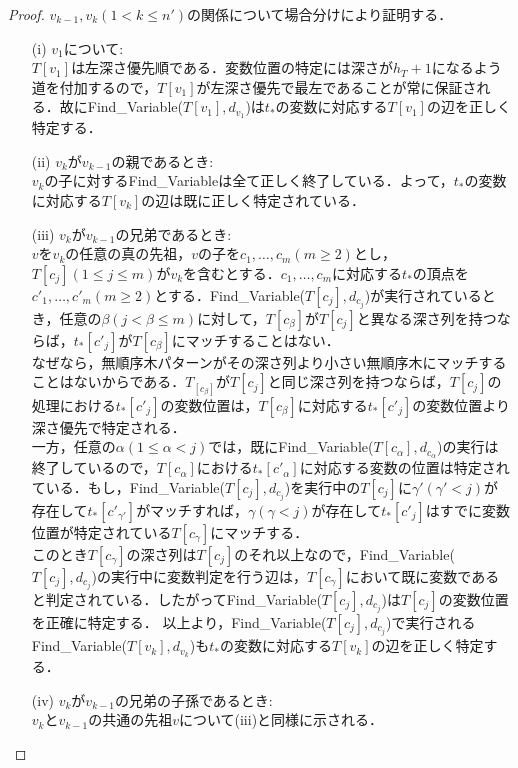 \begin{proof}
  $v_{k-1},v_k(1<k\leq n')$の関係について場合分けにより証明する．
  \begin{enumerate}
    \item[(i)] $v_1$について:\\
                $T[v_1]$は左深さ優先順である．変数位置の特定には深さが$h_T+1$になるよう道を付加するので，$T[v_1]$が左深さ優先で最左であることが常に保証される．故にFind\_Variable($T[v_1],d_{v_1}$)は$t_{\ast}$の変数に対応する$T[v_1]$の辺を正しく特定する．
    \item[(ii)] $v_k$が$v_{k-1}$の親であるとき:\\
                $v_k$の子に対するFind\_Variableは全て正しく終了している．よって，$t_{\ast}$の変数に対応する$T[v_k]$の辺は既に正しく特定されている．
    \item[(iii)] $v_k$が$v_{k-1}$の兄弟であるとき:\\
                $v$を$v_k$の任意の真の先祖，$v$の子を$c_1,\ldots,c_m(m\geq2)$とし，$T[c_j](1\leq j\leq m)$が$v_k$を含むとする．$c_1,\ldots,c_m$に対応する$t_{\ast}$の頂点を$c'_1,\ldots,c'_m(m\geq2)$とする．Find\_Variable($T[c_j],d_{c_j}$)が実行されているとき，任意の$\beta(j<\beta\leq m)$に対して，$T[c_\beta]$が$T[c_j]$と異なる深さ列を持つならば，$t_{\ast}[c'_j]$が$T[c_\beta]$にマッチすることはない．\\
                なぜなら，無順序木パターンがその深さ列より小さい無順序木にマッチすることはないからである．$T_[c_\beta]$が$T[c_j]$と同じ深さ列を持つならば，$T[c_j]$の処理における$t_{\ast}[c'_j]$の変数位置は，$T[c_\beta]$に対応する$t_\ast [c'_j]$の変数位置より深さ優先で特定される．\\
                一方，任意の$\alpha(1\leq\alpha<j)$では，既にFind\_Variable($T[c_\alpha],d_{c_\alpha}$)の実行は終了しているので，$T[c_\alpha]$における$t_\ast [c'_\alpha]$に対応する変数の位置は特定されている．もし，Find\_Variable($T[c_j],d_{c_j}$)を実行中の$T[c_j]$に$\gamma '(\gamma '<j)$が存在して$t_\ast[c'_{\gamma '}]$がマッチすれば，$\gamma(\gamma<j)$が存在して$t_\ast [c'_j]$はすでに変数位置が特定されている$T[c_\gamma]$にマッチする．\\
                このとき$T[c_\gamma]$の深さ列は$T[c_j]$のそれ以上なので，Find\_Variable($T[c_j],d_{c_j}$)の実行中に変数判定を行う辺は，$T[c_\gamma]$において既に変数であると判定されている．したがってFind\_Variable($T[c_j],d_{c_j}$)は$T[c_j]$の変数位置を正確に特定する．
                以上より，Find\_Variable($T[c_j],d_{c_j}$)で実行されるFind\_Variable($T[v_k],d_{v_k}$)も$t_\ast$の変数に対応する$T[v_k]$の辺を正しく特定する．
    \item[(iv)] $v_k$が$v_{k-1}$の兄弟の子孫であるとき:\\
                $v_k$と$v_{k-1}$の共通の先祖$v$について(iii)と同様に示される．
  \end{enumerate}
\end{proof}

